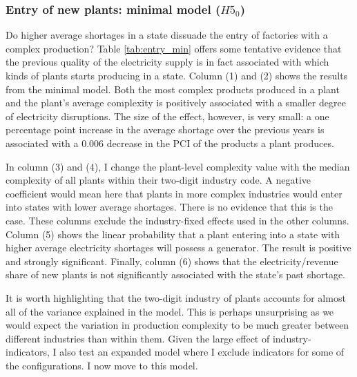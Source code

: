 \documentclass[11pt]{article}
\begin{document}
\subsubsection{Entry of new plants: minimal model ($H5_0$)}

Do higher average shortages in a state dissuade the entry of factories with a complex production? Table \ref{tab:entry_min} offers some tentative evidence that the previous quality of the electricity supply is in fact associated with which kinds of plants starts producing in a state. Column (1) and (2) shows the results from the minimal model. Both the most complex products produced in a plant and the plant's average complexity is positively associated with a smaller degree of electricity disruptions. The size of the effect, however, is very small: a one percentage point increase in the average shortage over the previous years is associated with a 0.006 decrease in the PCI of the products a plant produces.

In column (3) and (4), I change the plant-level complexity value with the median complexity of all plants within their two-digit industry code. A negative coefficient would mean here that plants in more complex industries would enter into states with lower average shortages. There is no evidence that this is the case. These columns exclude the industry-fixed effects used in the other columns. Column (5) shows the linear probability that a plant entering into a state with higher average electricity shortages will possess a generator. The result is positive and strongly significant. Finally, column (6) shows that the electricity/revenue share of new plants is not significantly associated with the state's past shortage.

It is worth highlighting that the two-digit industry of plants accounts for almost all of the variance explained in the model. This is perhaps unsurprising as we would expect the variation in production complexity to be much greater between different industries than within them. Given the large effect of industry-indicators, I also test an expanded model where I exclude indicators for some of the configurations. I now move to this model.
\end{document}
